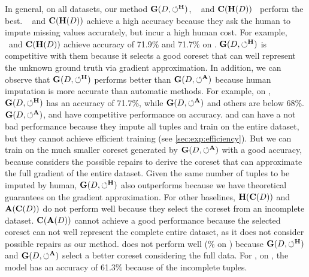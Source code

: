 In general, on all datasets, our method $\mathbf{G}(D,\circlearrowleft^\mathbf{H})$, \truth~ and $\mathbf{C}(\mathbf{H}(D))$~   perform the best. 
 \truth~ and $\mathbf{C}(\mathbf{H}(D))$ achieve a high accuracy because they ask the human to impute missing values accurately, but incur a high human cost.  For example, \truth~and $\mathbf{C}(\mathbf{H}(D))$ achieve accuracy of 71.9\% and 71.7\% on \adult. $\mathbf{G}(D,\circlearrowleft^\mathbf{H})$  is competitive with them because it selects a good coreset that can well represent the unknown ground truth via gradient approximation. In addition, we can observe that $\mathbf{G}(D,\circlearrowleft^\mathbf{H})$ performs better than $\mathbf{G}(D,\circlearrowleft^\mathbf{A})$ because human imputation is more accurate than automatic methods. For example, on \adult, $\mathbf{G}(D,\circlearrowleft^\mathbf{H})$ has an accuracy of 71.7\%, while $\mathbf{G}(D,\circlearrowleft^\mathbf{A})$ and others are below 68\%. $\mathbf{G}(D,\circlearrowleft^\mathbf{A})$, \boostclean and \gain have competitive performance on accuracy. \boostclean and \gain can have a not bad performance because they impute all tuples and train on the entire dataset, but they cannot achieve efficient training (see \ref{sec:exp:efficiency}). But  we can train on the much smaller coreset generated by $\mathbf{G}(D,\circlearrowleft^\mathbf{A})$ with a good accuracy, because \ours considers the possible repairs to derive the coreset  that can approximate the full gradient of the entire dataset. Given the same number of tuples to be imputed by human,  $\mathbf{G}(D,\circlearrowleft^\mathbf{H})$ also outperforms \actclean because we have theoretical guarantees on the gradient approximation. 
  For other baselines,  $\mathbf{H}(\mathbf{C}(D))$ and $\mathbf{A}(\mathbf{C}(D))$ do not perform well because they select the coreset from an incomplete dataset.  $\mathbf{C}(\mathbf{A}(D))$ cannot achieve a good performance because the selected coreset can not well represent the complete entire dataset, as it does not consider possible repairs as our method.  %
  {\mixcore} does not perform well (\% on \adult) because $\mathbf{G}(D,\circlearrowleft^\mathbf{H})$ and $\mathbf{G}(D,\circlearrowleft^\mathbf{A})$ select a better coreset considering the full data. For \noclean, on  \adult, the model  has an accuracy of 61.3\% because of the incomplete tuples.



